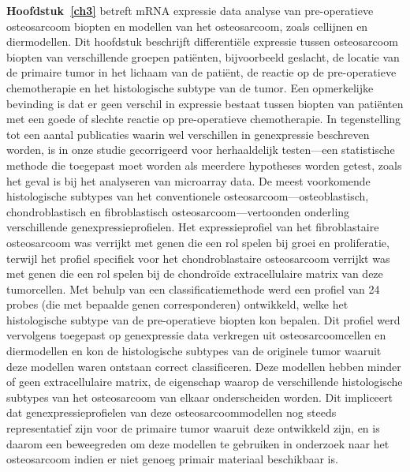 {\bf Hoofdstuk~\ref{ch3}} betreft mRNA expressie data analyse van pre\hyp{}operatieve osteosarcoom biopten en modellen van het osteosarcoom, zoals cellijnen en diermodellen. Dit hoofdstuk beschrijft differenti\"ele expressie tussen osteosarcoom biopten van verschillende groepen pati\"enten, bijvoorbeeld geslacht, de locatie van de primaire tumor in het lichaam van de pati\"ent, de reactie op de pre\hyp{}operatieve chemotherapie en het histologische subtype van de tumor. Een opmerkelijke bevinding is dat er geen verschil in expressie bestaat tussen biopten van pati\"enten met een goede of slechte reactie op pre\hyp{}operatieve chemotherapie. In tegenstelling tot een aantal publicaties waarin wel verschillen in genexpressie beschreven worden, is in onze studie gecorrigeerd voor herhaaldelijk testen---een statistische methode die toegepast moet worden als meerdere hypotheses worden getest, zoals het geval is bij het analyseren van microarray data. De meest voorkomende histologische subtypes van het conventionele osteosarcoom---osteoblastisch, chondroblastisch en fibroblastisch osteosarcoom---vertoonden onderling verschillende genexpressieprofielen. Het expressieprofiel van het fibroblastaire osteosarcoom was verrijkt met genen die een rol spelen bij groei en proliferatie, terwijl het profiel specifiek voor het chondroblastaire osteosarcoom verrijkt was met genen die een rol spelen bij de chondro\"ide extracellulaire matrix van deze tumorcellen. Met behulp van een classificatiemethode werd een profiel van 24 probes (die met bepaalde genen corresponderen) ontwikkeld, welke het histologische subtype van de pre\hyp{}operatieve biopten kon bepalen. Dit profiel werd vervolgens toegepast op genexpressie data verkregen uit osteosarcoomcellen en diermodellen en kon de histologische subtypes van de originele tumor waaruit deze modellen waren ontstaan correct classificeren. Deze modellen hebben minder of geen extracellulaire matrix, de eigenschap waarop de verschillende histologische subtypes van het osteosarcoom van elkaar onderscheiden worden. Dit impliceert dat genexpressieprofielen van deze osteosarcoommodellen nog steeds representatief zijn voor de primaire tumor waaruit deze ontwikkeld zijn, en is daarom een beweegreden om deze modellen te gebruiken in onderzoek naar het osteosarcoom indien er niet genoeg primair materiaal beschikbaar is.

